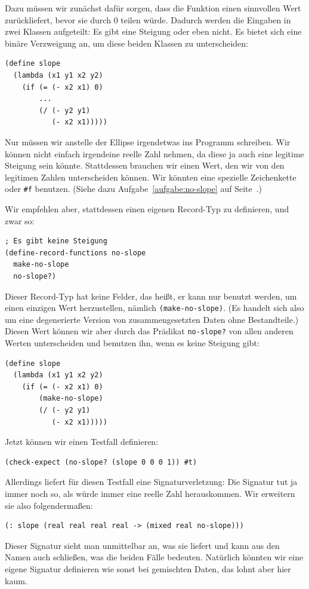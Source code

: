 Dazu müssen wir zunächst dafür sorgen, dass die Funktion einen
sinnvollen Wert zurückliefert, bevor sie durch 0 teilen würde.
Dadurch werden die Eingaben in zwei Klassen aufgeteilt: Es gibt eine
Steigung oder eben nicht.  Es bietet sich eine binäre Verzweigung an,
um diese beiden Klassen zu unterscheiden:
%
\begin{lstlisting}
(define slope
  (lambda (x1 y1 x2 y2)
    (if (= (- x2 x1) 0)
        ...
        (/ (- y2 y1)
           (- x2 x1))))) 
\end{lstlisting}
%
Nur müssen wir anstelle der Ellipse irgendetwas ins Programm
schreiben.  Wir können nicht einfach irgendeine reelle Zahl nehmen, da
diese ja auch eine legitime Steigung sein könnte.  Stattdessen
brauchen wir einen Wert, den wir von den legitimen Zahlen
unterscheiden können.  Wir könnten eine spezielle Zeichenkette oder
\lstinline{#f} benutzen.  (Siehe dazu Aufgabe~\ref{aufgabe:no-slope}
auf Seite~\pageref{aufgabe:no-slope}.)

Wir empfehlen aber, stattdessen einen eigenen Record-Typ zu
definieren, und zwar so:
%
\begin{lstlisting}
; Es gibt keine Steigung
(define-record-functions no-slope
  make-no-slope
  no-slope?)
\end{lstlisting}
%
Dieser Record-Typ hat keine Felder, das heißt, er kann nur benutzt
werden, um einen einzigen Wert herzustellen, nämlich
\lstinline{(make-no-slope)}.  (Es handelt sich also um eine
degenerierte Version von zusammengesetzten Daten ohne Bestandteile.)
Diesen Wert können wir aber durch das Prädikat \lstinline{no-slope?}
von allen anderen Werten unterscheiden und benutzen ihn, wenn es keine
Steigung gibt:
%
\begin{lstlisting}
(define slope
  (lambda (x1 y1 x2 y2)
    (if (= (- x2 x1) 0)
        (make-no-slope)
        (/ (- y2 y1)
           (- x2 x1)))))
\end{lstlisting}
%
Jetzt können wir einen Testfall definieren:
%
\begin{lstlisting}
(check-expect (no-slope? (slope 0 0 0 1)) #t)
\end{lstlisting}
%
Allerdings liefert \drscheme{} für diesen Testfall eine
Signaturverletzung: Die Signatur tut ja immer noch so, als würde immer
eine reelle Zahl herauskommen.  Wir erweitern sie also folgendermaßen:
%
\begin{lstlisting}
(: slope (real real real real -> (mixed real no-slope)))
\end{lstlisting}
%
Dieser Signatur sieht man unmittelbar an, was sie liefert und kann aus
den Namen auch schließen, was die beiden Fälle bedeuten.  Natürlich
könnten wir eine eigene Signatur definieren wie sonst bei gemischten
Daten, das lohnt aber hier kaum.

